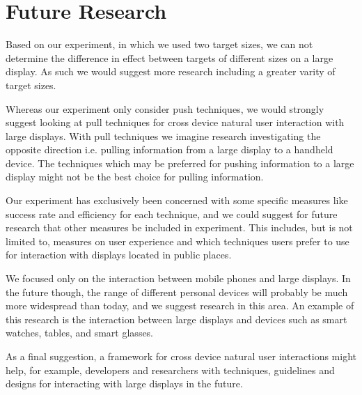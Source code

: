 \section{Future Research} \label{sec:futureresearch}
Based on our experiment, in which we used two target sizes, we can not determine the difference in effect between targets of different sizes on a large display. As such we would suggest more research including a greater varity of target sizes.

Whereas our experiment only consider push techniques, we would strongly suggest looking at pull techniques for cross device natural user interaction with large displays.
With pull techniques we imagine research investigating the opposite direction i.e. pulling information from a large display to a handheld device.
The techniques which may be preferred for pushing information to a large display might not be the best choice for pulling information.

Our experiment has exclusively been concerned with some specific measures like success rate and efficiency for each technique, and we could suggest for future research that other measures be included in experiment.
This includes, but is not limited to, measures on user experience and which techniques users prefer to use for interaction with displays located in public places.

We focused only on the interaction between mobile phones and large displays.
In the future though, the range of different personal devices will probably be much more widespread than today, and we suggest research in this area.
An example of this research is the interaction between large displays and devices such as smart watches, tables, and smart glasses.

As a final suggestion, a framework for cross device natural user interactions might help, for example, developers and researchers with techniques, guidelines and designs for interacting with large displays in the future.